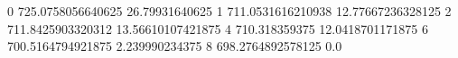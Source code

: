 0 725.0758056640625 26.79931640625
1 711.0531616210938 12.77667236328125
2 711.8425903320312 13.56610107421875
4 710.318359375 12.0418701171875
6 700.5164794921875 2.239990234375
8 698.2764892578125 0.0
